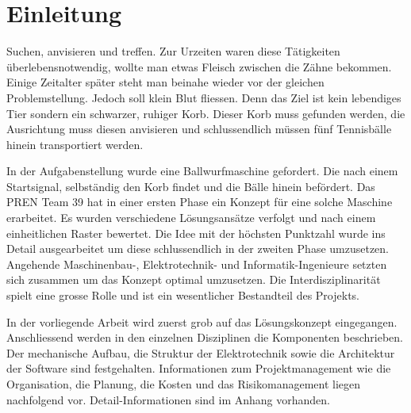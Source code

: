 \section{Einleitung}

Suchen, anvisieren und treffen. Zur Urzeiten waren diese Tätigkeiten überlebensnotwendig, wollte man etwas Fleisch zwischen die Zähne bekommen. Einige Zeitalter später steht man beinahe wieder vor der gleichen Problemstellung. Jedoch soll klein Blut fliessen. Denn das Ziel ist kein lebendiges Tier sondern ein schwarzer, ruhiger Korb. Dieser Korb muss gefunden werden, die Ausrichtung muss diesen anvisieren und schlussendlich müssen fünf Tennisbälle hinein transportiert werden.

In der Aufgabenstellung wurde eine Ballwurfmaschine gefordert. Die nach einem Startsignal, selbständig den Korb findet und die Bälle hinein befördert. Das PREN Team 39 hat in einer ersten Phase ein Konzept für eine solche Maschine erarbeitet. Es wurden verschiedene Lösungsansätze verfolgt und nach einem einheitlichen Raster bewertet. Die Idee mit der höchsten Punktzahl wurde ins Detail ausgearbeitet um diese schlussendlich in der zweiten Phase umzusetzen. Angehende Maschinenbau-, Elektrotechnik- und Informatik-Ingenieure setzten sich zusammen um das Konzept optimal umzusetzen. Die Interdisziplinarität spielt eine grosse Rolle und ist ein wesentlicher Bestandteil des Projekts.

In der vorliegende Arbeit wird zuerst grob auf das Lösungskonzept eingegangen. Anschliessend werden in den einzelnen Disziplinen die Komponenten beschrieben. Der mechanische Aufbau, die Struktur der Elektrotechnik sowie die Architektur der Software sind festgehalten. Informationen zum Projektmanagement wie die Organisation, die Planung, die Kosten und das Risikomanagement liegen nachfolgend vor. Detail-Informationen sind im Anhang vorhanden.



